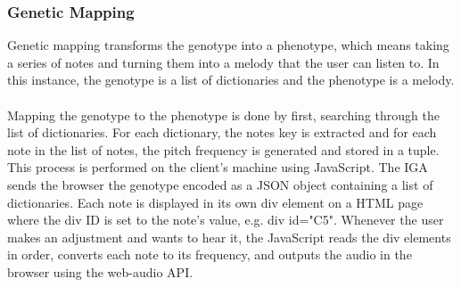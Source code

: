 \documentclass[12pt]{article} %
\begin{document}
\subsubsection{Genetic Mapping}
Genetic mapping transforms the genotype into a phenotype, which means taking a series of notes and turning them into a melody that the user can listen to. In this instance, the genotype is a list of dictionaries and the phenotype is a melody. \\%
\\
Mapping the genotype to the phenotype is done by first, searching through the list of dictionaries. For each dictionary, the notes key is extracted and for each note in the list of notes, the pitch frequency is generated and stored in a tuple. \\

This process is performed on the client's machine using JavaScript. The IGA sends the browser the genotype encoded as a JSON object containing a list of dictionaries. Each note is displayed in its own div element on a HTML page where the div ID is set to the note's value, e.g. div id="C5". Whenever the user makes an adjustment and wants to hear it, the JavaScript reads the div elements in order, converts each note to its frequency, and outputs the audio in the browser using the web-audio API.%
\end{document}
